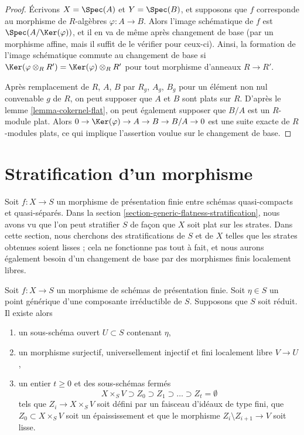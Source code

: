 \begin{proof}
\medskip\noindent
Écrivons $X = \Spec(A)$ et $Y = \Spec(B)$, et supposons que $f$ corresponde
au morphisme de $R$-algèbres $\varphi : A \to B$.
Alors l'image schématique de $f$ est $\Spec(A/\Ker(\varphi))$,
et il en va de même après changement de base (par un morphisme affine, mais il
suffit de le vérifier pour ceux-ci).
Ainsi, la formation de l'image schématique commute
au changement de base si $\Ker(\varphi \otimes_R R') = \Ker(\varphi) \otimes_R R'$
pour tout morphisme d'anneaux $R \to R'$.

\medskip\noindent
Après remplacement de $R$, $A$, $B$ par $R_g$, $A_g$, $B_g$ pour un
élément non nul convenable $g$ de $R$, on peut supposer que $A$ et $B$ sont plats sur $R$.
D'après le lemme \ref{lemma-cokernel-flat},
on peut également supposer que $B/A$ est un $R$-module plat.
Alors $0 \to \Ker(\varphi) \to A \to B \to B/A \to 0$
est une suite exacte de $R$-modules plats, ce qui implique
l'assertion voulue sur le changement de base.
\end{proof}






\section{Stratification d'un morphisme}
\label{section-stratifying-morphisms}

\noindent
Soit $f : X \to S$ un morphisme de présentation finie entre schémas quasi-compacts
et quasi-séparés.
Dans la section \ref{section-generic-flatness-stratification},
nous avons vu que l'on peut stratifier $S$ de façon que $X$ soit plat
sur les strates. Dans cette section, nous cherchons des stratifications de $S$
et de $X$ telles que les strates obtenues soient lisses ; cela ne fonctionne pas tout à fait,
et nous aurons également besoin d'un changement de base par des morphismes finis localement libres.

\begin{lemma}
\label{lemma-smoothness-stratification-at-generic-point}
Soit $f : X \to S$ un morphisme de schémas de présentation finie.
Soit $\eta \in S$ un point générique d'une composante irréductible de $S$.
Supposons que $S$ soit réduit. Il existe alors
\begin{enumerate}
\item un sous-schéma ouvert $U \subset S$ contenant $\eta$,
\item un morphisme surjectif, universellement injectif et fini localement libre
$V \to U$,
\item un entier $t \geq 0$ et des sous-schémas fermés
$$
X \times_S V \supset Z_0 \supset Z_1 \supset \ldots \supset Z_t = \emptyset
$$
tels que $Z_i \to X \times_S V$ soit défini par un faisceau d'idéaux de type fini,
que $Z_0 \subset X \times_S V$ soit un épaississement et que le morphisme
$Z_i \setminus Z_{i + 1} \to V$ soit lisse.
\end{enumerate}
\end{lemma}

